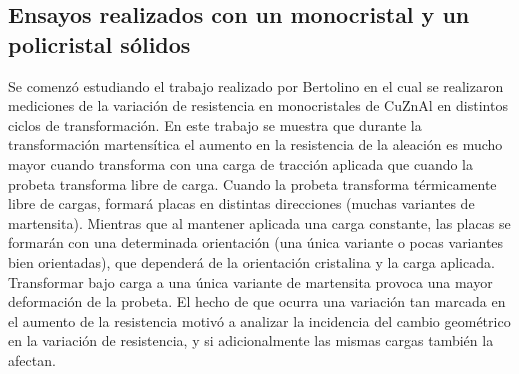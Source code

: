 \documentclass[a4paper,12pt,fleqn,twoside,openany]{book}
\begin{document}

\subsection{Ensayos realizados con un monocristal y un policristal sólidos} \label{PoilicMonocrist}




 
Se comenzó estudiando el trabajo realizado por Bertolino \cite{resistencia} en el cual se realizaron mediciones de la variación de resistencia en monocristales de CuZnAl en distintos ciclos de transformación. En este trabajo se muestra que durante la transformación martensítica el aumento en la resistencia de la aleación es mucho mayor  cuando transforma con una carga de tracción aplicada que cuando la probeta transforma libre de carga. Cuando la probeta transforma térmicamente libre de cargas, formará placas en distintas direcciones (muchas variantes de martensita). Mientras que al mantener aplicada una carga constante, las placas se formarán con una determinada orientación (una única variante o pocas variantes bien orientadas), que dependerá de la orientación cristalina y la carga aplicada. Transformar bajo carga a una única variante de martensita provoca una mayor deformación de la probeta. El hecho de que ocurra una variación tan marcada en el aumento de la resistencia motivó a analizar la incidencia del cambio geométrico en la variación de resistencia, y si adicionalmente las mismas cargas también la afectan. 
\end{document}
